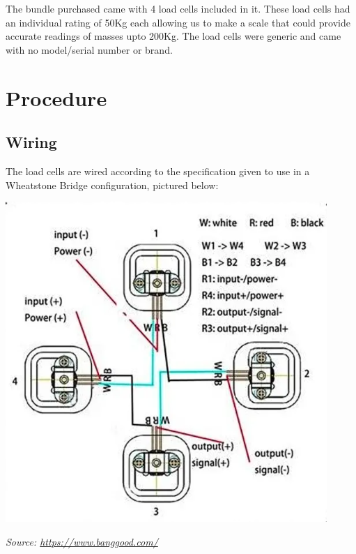 \documentclass[10pt]{article}
\begin{document}
The bundle purchased came with 4 load cells included in it. These load cells had an individual rating of 50Kg each allowing us to make a scale that could provide accurate readings of masses upto 200Kg. The load cells were generic and came with no model/serial number or brand.



\section{Procedure}
\subsection{Wiring}
The load cells are wired according to the specification given to use in a Wheatstone Bridge configuration, pictured below:

{\center\includegraphics[scale=.5]{loadcellwiring}\par}
{\textit{Source: \href{https://www.banggood.com/4pcs-DIY-50KG-Body-Load-Cell-Weight-Strain-Sensor-Resistance-With-HX711-AD-Module-p-1326815.html?utm_source=googleshopping&utm_medium=cpc_organic&gmcCountry=US&utm_content=shopping&utm_campaign=us-pc&currency=USD&createTmp=1&utm_source=googleshopping&utm_medium=cpc_bgs&utm_content=frank&utm_campaign=frank-ssc-us-toys-tool-ele-newcustom-ncv80-0116&ad_id=411455834827&gclid=Cj0KCQjwy6T1BRDXARIsAIqCTXpl9vvx29pgQ5I5bO3OfoMXg4CrioA-04iYSjtnyxtn5z5hVLJjgT4aAulwEALw_wcB&cur_warehouse=CN}{https://www.banggood.com/}}}
\end{document}
